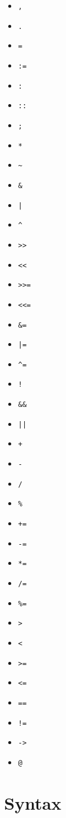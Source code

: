 \documentclass[a4paper]{article}
\begin{document}
\begin{itemize}
    \item \verb|,|
    \item \verb|.|
    \item \verb|=|
    \item \verb|:=|
    \item \verb|:|
    \item \verb|::|
    \item \verb|;|
    \item \verb|*|
    \item \verb|~|
    \item \verb|&|
    \item \verb/|/
    \item \verb|^|
    \item \verb|>>|
    \item \verb|<<|
    \item \verb|>>=|
    \item \verb|<<=|
    \item \verb|&=|
    \item \verb/|=/
    \item \verb|^=|
    \item \verb|!|
    \item \verb|&&|
    \item \verb/||/
    \item \verb|+|
    \item \verb|-|
    \item \verb|/|
    \item \verb|%|
    \item \verb|+=|
    \item \verb|-=|
    \item \verb|*=|
    \item \verb|/=|
    \item \verb|%=|
    \item \verb|>|
    \item \verb|<|
    \item \verb|>=|
    \item \verb|<=|
    \item \verb|==|
    \item \verb|!=|
    \item \verb|->|
    \item \verb|@|
\end{itemize}

\pagebreak

\section{Syntax}
\end{document}
